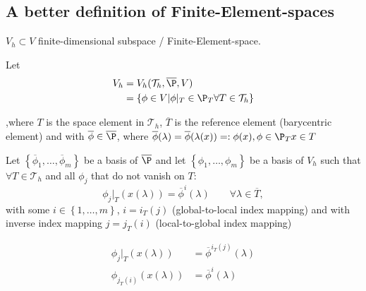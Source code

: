 \subsection{A better definition of Finite-Element-spaces}
\label{sec:A better definition of Finite-Element-spaces}

$V_{h} \subset V$ finite-dimensional subspace / Finite-Element-space.

Let 
\begin{align*}
	V_{h} &= V_{h}(\mathcal{T}_{h}, \overline{\P}, V) \\
		  &= \left\{  \phi \in V | \phi |_{T} \in \P_{T} \forall T \in \mathcal{T}_{h} \right\}  
\end{align*}

,where $T$ is the space element in $\mathcal{T}_{h}$, $\overline{T}$ is the reference element (barycentric element) and with $\overline{\phi } \in \overline{\P}$, where $\overline{\phi }(\lambda ) = \overline{\phi }(\lambda (x)) =: \phi (x), \phi  \in \P_{T} x \in T$

Let $\left\{ \overline{\phi}_{1}, \ldots, \overline{\phi }_{m} \right\} $ be a basis of $\overline{\P}$ and let $\left\{ \phi _{1}, \ldots , \phi _{m} \right\}$ be a basis of $V_{h}$ such that $\forall T \in \mathcal{T}_{h}$ and all $\phi _{j}$ that do not vanish on $T$:
\[
	\phi _{j}|_{T}(x(\lambda )) = \overline{\phi }^{i}(\lambda ) \qquad \forall \lambda  \in \overline{T}
,\] 
with some $i \in \left\{ 1, \ldots, m \right\} $, $ i= i_{T}(j)$ (global-to-local index mapping) and with inverse index mapping $j=j_{T}(i)$ (local-to-global index mapping)

\begin{align*}
	\phi _{j}|_{T}(x(\lambda )) &= \overline{\phi }^{i_{T}(j)}(\lambda ) \\
	\phi _{j_{T}(i)}(x(\lambda )) &= \overline{\phi }^{i}(\lambda )
\end{align*}

